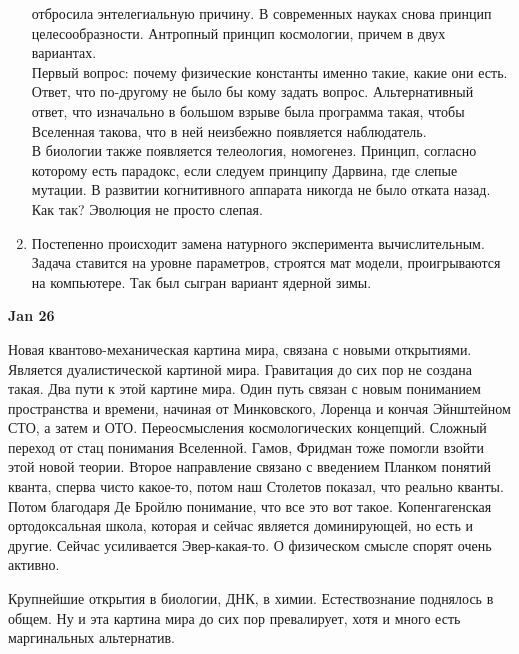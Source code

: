 \documentclass[a4paper, 12pt]{article}
\begin{document}
\begin{enumerate}
    отбросила энтелегиальную причину. В современных науках снова принцип 
    целесообразности. Антропный принцип космологии, причем в двух 
    вариантах.
    \\ Первый вопрос: почему физические константы именно такие, какие 
    они есть. Ответ, что по-другому не было бы кому задать вопрос. 
    Альтернативный ответ, что изначально в большом взрыве была программа 
    такая, чтобы Вселенная такова, что в ней неизбежно появляется 
    наблюдатель.
    \\ В биологии также появляется телеология, номогенез. Принцип, 
    согласно которому есть парадокс, если следуем принципу Дарвина, где 
    слепые мутации. В развитии когнитивного аппарата никогда не было 
    отката назад. Как так? Эволюция не просто слепая.
  \item Постепенно происходит замена натурного эксперимента 
    вычислительным. Задача ставится на уровне параметров, строятся мат 
    модели, проигрываются на компьютере. Так был сыгран вариант ядерной 
    зимы.
\end{enumerate}

\hfill \textbf{Jan 26}

Новая квантово-механическая картина мира, связана с новыми открытиями. 
Является дуалистической картиной мира. Гравитация до сих пор не создана 
такая. Два пути к этой картине мира. Один путь связан с новым пониманием 
пространства и времени, начиная от Минковского, Лоренца и кончая 
Эйнштейном СТО, а затем и ОТО. Переосмысления космологических концепций. 
Сложный переход от стац понимания Вселенной. Гамов, Фридман тоже помогли 
взойти этой новой теории. Второе направление связано с введением Планком 
понятий кванта, сперва чисто какое-то, потом наш Столетов показал, что 
реально кванты. Потом благодаря Де Бройлю понимание, что все это вот 
такое. Копенгагенская ортодоксальная школа, которая и сейчас является 
доминирующей, но есть и другие. Сейчас усиливается Эвер-какая-то. 
О физическом смысле спорят очень активно.

Крупнейшие открытия в биологии, ДНК, в химии. Естествознание поднялось 
в общем. Ну и эта картина мира до сих пор превалирует, хотя и много есть 
маргинальных альтернатив.
\end{document}
